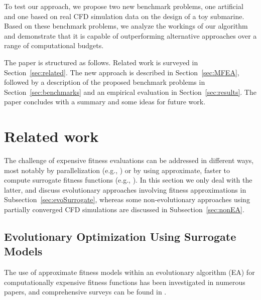 To test our approach, we propose two new benchmark problems, one artificial and one based on real CFD simulation data on the design of a toy submarine. Based on these benchmark problems, we analyze the workings of our algorithm and demonstrate that it is capable of outperforming alternative approaches over a range of computational budgets. 


The paper is structured as follows. Related work is surveyed in Section~\ref{sec:related}. The new approach is described in Section~\ref{sec:MFEA}, followed by a description of the proposed benchmark problems in Section~\ref{sec:benchmarks} and an empirical evaluation in Section~\ref{sec:results}. The paper concludes with a summary and some ideas for future work.

\section{Related work\label{sec:related}}

The challenge of expensive fitness evaluations can be addressed in different ways, most notably by parallelization (e.g., \cite{GCZZZ15}) or by using approximate, faster to compute surrogate fitness functions (e.g., \cite{Bhatt13}).
In this section we only deal with the latter, and discuss evolutionary approaches involving fitness approximations in Subsection~\ref{sec:evoSurrogate}, whereas some non-evolutionary approaches using partially converged CFD simulations are discussed in Subsection~\ref{sec:nonEA}.

\subsection{Evolutionary Optimization Using Surrogate Models \label{sec:evoSurrogate}}
The use of approximate fitness models within an evolutionary algorithm (EA) for computationally expensive fitness functions has been investigated in numerous papers, and comprehensive surveys 
can be found in  \cite{JinBranke2005,Jin2005,Jin2011,Shi2010}.

